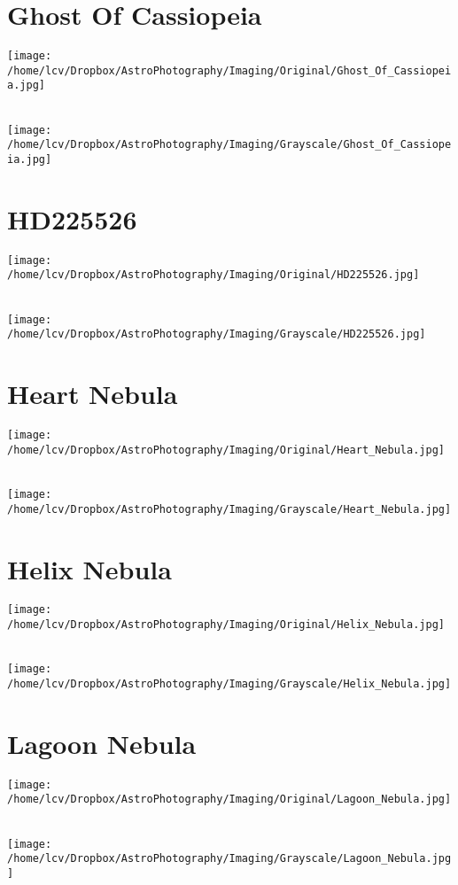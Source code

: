 \section{Ghost Of Cassiopeia}
\texttt{[image: /home/lcv/Dropbox/AstroPhotography/Imaging/Original/Ghost\_Of\_Cassiopeia.jpg]}
{\footnotesize\color{white}

}\ \\
\texttt{[image: /home/lcv/Dropbox/AstroPhotography/Imaging/Grayscale/Ghost\_Of\_Cassiopeia.jpg]}
\begin{center}
\end{center}
\section{HD225526}
\texttt{[image: /home/lcv/Dropbox/AstroPhotography/Imaging/Original/HD225526.jpg]}
{\footnotesize\color{white}

}\ \\
\texttt{[image: /home/lcv/Dropbox/AstroPhotography/Imaging/Grayscale/HD225526.jpg]}
\begin{center}
\end{center}
\section{Heart Nebula}
\texttt{[image: /home/lcv/Dropbox/AstroPhotography/Imaging/Original/Heart\_Nebula.jpg]}
{\footnotesize\color{white}

}\ \\
\texttt{[image: /home/lcv/Dropbox/AstroPhotography/Imaging/Grayscale/Heart\_Nebula.jpg]}
\begin{center}
\end{center}
\section{Helix Nebula}
\texttt{[image: /home/lcv/Dropbox/AstroPhotography/Imaging/Original/Helix\_Nebula.jpg]}
{\footnotesize\color{white}

}\ \\
\texttt{[image: /home/lcv/Dropbox/AstroPhotography/Imaging/Grayscale/Helix\_Nebula.jpg]}
\begin{center}
\end{center}
\section{Lagoon Nebula}
\texttt{[image: /home/lcv/Dropbox/AstroPhotography/Imaging/Original/Lagoon\_Nebula.jpg]}
{\footnotesize\color{white}

}\ \\
\texttt{[image: /home/lcv/Dropbox/AstroPhotography/Imaging/Grayscale/Lagoon\_Nebula.jpg]}
\begin{center}
\end{center}
